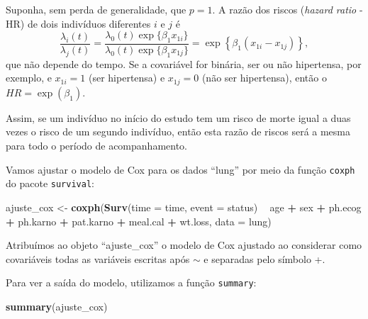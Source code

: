 \documentclass[
]{book}
\newenvironment{Shaded}{\begin{snugshade}}{\end{snugshade}}
\newcommand{\DataTypeTok}[1]{\textcolor[rgb]{0.13,0.29,0.53}{#1}}
\newcommand{\KeywordTok}[1]{\textcolor[rgb]{0.13,0.29,0.53}{\textbf{#1}}}
\newcommand{\NormalTok}[1]{#1}
\newcommand{\OperatorTok}[1]{\textcolor[rgb]{0.81,0.36,0.00}{\textbf{#1}}}
\newcommand{\StringTok}[1]{\textcolor[rgb]{0.31,0.60,0.02}{#1}}
\begin{document}
Suponha, sem perda de generalidade, que \(p=1\). A razão dos riscos (\emph{hazard ratio} - HR) de dois indivíduos diferentes \(i\) e \(j\) é
\[
 \frac{\lambda_i(t)}{\lambda_j(t)} = \frac{\lambda_0(t) \exp\{\beta_1x_{1i}\}}{\lambda_0(t) \exp\{\beta_1x_{1j}\}}=\exp\left\{\beta_1(x_{1i}-x_{1j})\right\},  \nonumber
\]
que não depende do tempo. Se a covariável for binária, ser ou não hipertensa, por exemplo, e \(x_{1i}=1\) (ser hipertensa) e \(x_{1j}=0\) (não ser hipertensa), então o \(HR=\exp(\beta_1)\).

Assim, se um indivíduo no início do estudo tem um risco de morte igual a duas vezes o risco de um segundo indivíduo, então esta
razão de riscos será a mesma para todo o período de
acompanhamento.

Vamos ajustar o modelo de Cox para os dados ``lung'' por meio da função \texttt{coxph} do pacote \texttt{survival}:

\begin{Shaded}
\begin{Highlighting}[]
\NormalTok{ajuste_cox <-}\StringTok{ }\KeywordTok{coxph}\NormalTok{(}\KeywordTok{Surv}\NormalTok{(}\DataTypeTok{time =}\NormalTok{ time, }\DataTypeTok{event =}\NormalTok{ status) }\OperatorTok{~}\StringTok{ }\NormalTok{age }\OperatorTok{+}\StringTok{ }\NormalTok{sex }\OperatorTok{+}\StringTok{ }\NormalTok{ph.ecog }\OperatorTok{+}\StringTok{ }\NormalTok{ph.karno }\OperatorTok{+}\StringTok{ }\NormalTok{pat.karno }\OperatorTok{+}\StringTok{ }\NormalTok{meal.cal }\OperatorTok{+}\StringTok{ }\NormalTok{wt.loss, }\DataTypeTok{data =}\NormalTok{ lung)}
\end{Highlighting}
\end{Shaded}

Atribuímos ao objeto ``ajuste\_cox'' o modelo de Cox ajustado ao considerar como covariáveis todas as variáveis escritas após \(\sim\) e separadas pelo símbolo +.

Para ver a saída do modelo, utilizamos a função \texttt{summary}:

\begin{Shaded}
\begin{Highlighting}[]
\KeywordTok{summary}\NormalTok{(ajuste_cox)}
\end{Highlighting}
\end{Shaded}
\end{document}
